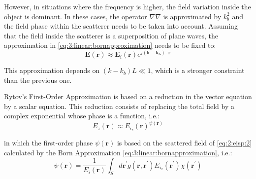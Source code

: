 			However, in situations where the frequency is higher, the field variation inside the object is dominant. In these cases, the operator $\nabla\nabla$ is approximated by $k_b^2$ and the field phase within the scatterer needs to be taken into account. Assuming that the field inside the scatterer is a superposition of plane waves, the approximation in \eqref{eq:3:linear:bornapproximation} needs to be fixed to:
			\begin{equation}
				\mathbf{E}(\mathbf{r}) \approx \mathbf{E}_i(\mathbf{r})e^{j(\mathbf{k}-\mathbf{k_b})\cdot\mathbf{r}}  \label{eq:3:linear:bornapproximation:5}
			\end{equation}
		
			This approximation depends on $(k-k_b)L\ll1$, which is a stronger constraint than the previous one.
			
			Rytov's First-Order Approximation is based on a reduction in the vector equation by a scalar equation. This reduction consists of replacing the total field by a complex exponential whose phase is a function, i.e.:
			\begin{equation}
				E_z(\mathbf{r}) \approx E_{i_z}(\mathbf{r})^{\psi(\mathbf{r})} \label{eq:3:linear:rytov:0}
			\end{equation}
		
			\noindent in which the first-order phase $\psi(\mathbf{r})$ is based on the scattered field of \eqref{eq:2:eisp:2} calculated by the Born Approximation \eqref{eq:3:linear:bornapproximation}, i.e.:
			\begin{equation}
				\psi(\mathbf{r}) = \frac{1}{E_i(\mathbf{r})} \int_S d\mathbf{r^\prime} g(\mathbf{r},\mathbf{r^\prime})E_{i_z}(\mathbf{r^\prime})\chi(\mathbf{r^\prime}) \label{eq:3:linear:rytov:1}
			\end{equation}
		
